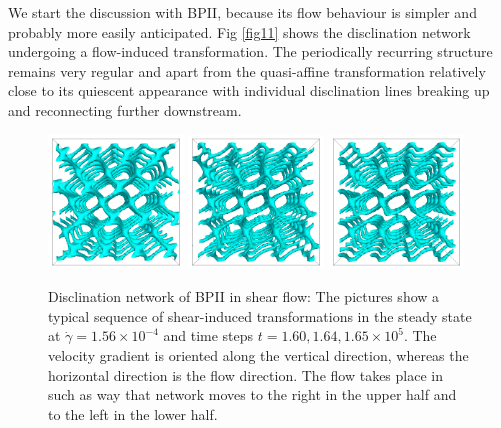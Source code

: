 \documentclass[aps,pre,onecolumn,groupedaddress]{revtex4-1}
\newcommand{\e}[1]{\times10^{#1}}
\begin{document}
We start the discussion with BPII, because its flow behaviour is simpler and probably more easily anticipated.
Fig \ref{fig11} shows the disclination network undergoing a flow-induced transformation.
The periodically recurring structure remains very regular and apart from the quasi-affine transformation relatively close to its quiescent appearance with individual disclination lines breaking up and reconnecting further downstream.

\begin{figure}[h]
\includegraphics[width=0.32\textwidth]{disc-160k_run902.png}
\includegraphics[width=0.32\textwidth]{disc-164k_run902.png}
\includegraphics[width=0.32\textwidth]{disc-165k_run902.png}
\caption{Disclination network of BPII in shear flow: The pictures show a typical sequence of shear-induced transformations in the steady state at $\dot{\gamma}=1.56\e{-4}$ and time steps $t=1.60, 1.64,1.65\e{5}$. The velocity gradient is oriented along the vertical direction, whereas the horizontal direction is the flow direction. The flow takes place in such as way that network moves to the right in the upper half and to the left in the lower half.}
\label{bp2-med}
\end{figure}
\end{document}
